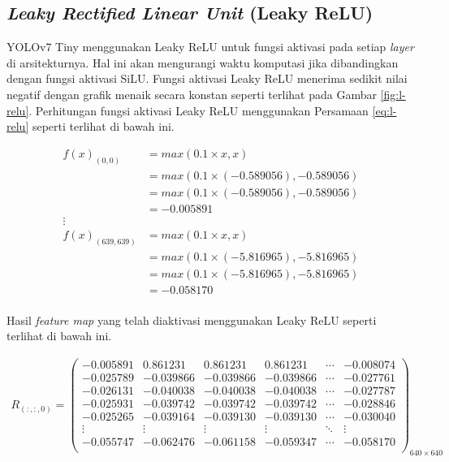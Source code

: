     \subsection{\textit{Leaky Rectified Linear Unit} (Leaky ReLU)}

    YOLOv7 Tiny menggunakan Leaky ReLU untuk fungsi aktivasi pada setiap \textit{layer} di arsitekturnya. Hal ini akan mengurangi waktu komputasi jika dibandingkan dengan fungsi aktivasi SiLU. Fungsi aktivasi Leaky ReLU menerima sedikit nilai negatif dengan grafik menaik secara konstan seperti terlihat pada Gambar \ref{fig:l-relu}. Perhitungan fungsi aktivasi Leaky ReLU menggunakan Persamaan \ref{eq:l-relu} seperti terlihat di bawah ini.

    \begin{align*}
        f(x)_{(0, 0)}       &= max(0.1\times x, x) \\
                            &= max(0.1\times (-0.589056), -0.589056) \\
                            &= max(0.1\times (-0.589056), -0.589056) \\
                            &= -0.005891 \\
        \vdots \\
        f(x)_{(639, 639)}   &= max(0.1\times x, x) \\
                            &= max(0.1\times (-5.816965), -5.816965) \\
                            &= max(0.1\times (-5.816965), -5.816965) \\
                            &= -0.058170 \\
    \end{align*}

    Hasil \textit{feature map} yang telah diaktivasi menggunakan Leaky ReLU seperti terlihat di bawah ini.

    \begin{align*}
        R_{(:, :, 0)} = 
        \begin{pmatrix}
            -0.005891 & 0.861231  & 0.861231  & 0.861231  & \cdots & -0.008074 \\
            -0.025789 & -0.039866 & -0.039866 & -0.039866 & \cdots & -0.027761 \\
            -0.026131 & -0.040038 & -0.040038 & -0.040038 & \cdots & -0.027787 \\
            -0.025931 & -0.039742 & -0.039742 & -0.039742 & \cdots & -0.028846 \\
            -0.025265 & -0.039164 & -0.039130 & -0.039130 & \cdots & -0.030040 \\
            \vdots    & \vdots    & \vdots    & \vdots    & \ddots & \vdots \\
            -0.055747 & -0.062476 & -0.061158 & -0.059347 & \cdots & -0.058170 \\
        \end{pmatrix}_{640\times 640}
    \end{align*}

